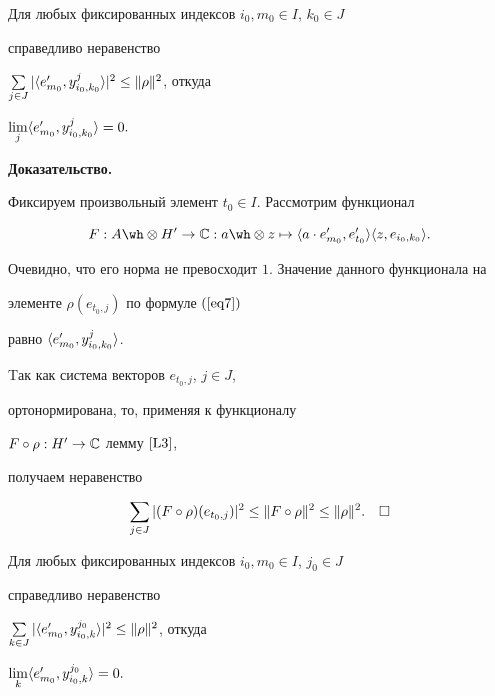 \begin{lem}


\label{L5}


Для любых фиксированных индексов $i_0,m_0 \in I$, $k_0 \in J$


справедливо неравенство


$\sum\limits_{j \in J} | \langle e'_{m_0},y^j_{i_0,k_0} \rangle |^2 \le \| \rho \|^2$, откуда


$\lim\limits_j \langle e'_{m_0},y^j_{i_0,k_0} \rangle =0.$


\end{lem}





{\bf Доказательство.}


Фиксируем произвольный элемент $t_0 \in I$. Рассмотрим функционал


$$


F:A \tens H' \to\Bbb C:a \tens z \mapsto


\lan a \cd e'_{m_0},e'_{t_0} \ran \lan z,e_{i_0,k_0} \ran.


$$


Очевидно, что его норма не превосходит $1$. Значение данного функционала на


элементе  $\rho (e_{t_0,j})$ по формуле $(\ref{eq7})$


равно $\langle e'_{m_0},y^j_{i_0,k_0} \rangle$.


Tак как система векторов $e_{t_0,j}$, $j \in J$,


ортонормирована, то, применяя к функционалу


$F \circ \rho:H' \to\Bbb C$ лемму $\ref{L3}$,


получаем неравенство


$$


\sumj |(F \circ \rho )(e_{t_0,j})|^2 \le \| F \circ \rho \|^2


\le \| \rho \|^2.\quad\square


$$





\begin{lem}


\label{L6}


Для любых фиксированных индексов $i_0,m_0 \in I$, $j_0 \in J$


справедливо неравенство


$\sum\limits_{k \in J} | \langle e'_{m_0},y^{j_0}_{i_0,k} \rangle |^2 \le \| \rho \|^2$, откуда


$\lim\limits_k \langle e'_{m_0},y^{j_0}_{i_0,k} \rangle =0.$


\end{lem}





